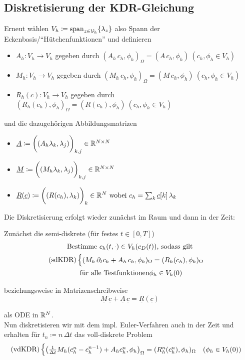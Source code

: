 \subsection{Diskretisierung der KDR-Gleichung}
Erneut wählen $ V_h \coloneqq \operatorname{span}_{z \in \mathcal{V}_h} \{ \lambda_z \} $ also Spann der Eckenbasis/\enquote{Hütchenfunktionen} und definieren
\begin{itemize}
	\item $ A_h: V_h \to V_h $ gegeben durch $ (A_h \, c_h, \phi_h)_\Omega = (A \, c_h, \phi_h) \ (c_h, \phi_h \in V_h)$
	\item $ M_h: V_h \to V_h $ gegeben durch $ (M_h \, c_h, \phi_h)_\Omega = (M \, c_h, \phi_h) \ (c_h, \phi_h \in V_h)$
	\item $ R_h(c): V_h \to V_h $ gegeben durch $ (R_h(c_h), \phi_h)_\Omega = (R(c_h), \phi_h) \ (c_h, \phi_h \in V_h)$
\end{itemize}
und die dazugehörigen Abbildungsmatrizen
\begin{itemize}
	\item $\underline{A} \coloneqq \bigg( (A_h \lambda_k, \lambda_j) \bigg)_{k,j} \in \mathbb{R}^{N \times N}$
	\item $\underline{M} \coloneqq \bigg( (M_h \lambda_k, \lambda_j) \bigg)_{k,j} \in \mathbb{R}^{N \times N}$
	\item $ \underline{R}(\underline{c}) \coloneqq \bigg( (R(c_h),\lambda_k) \bigg)_k \in \mathbb{R}^N \text{ wobei } c_h = \sum_k \underline{c}[k] \, \lambda_k $
\end{itemize}
Die Diskretisierung erfolgt wieder zunächst im Raum und dann in der Zeit:

Zunächst die semi-diskrete  (für festes $ t \in [0,T]$) 
\begin{gather*}
	\text{Bestimme } c_h(t,\cdot) \in V_h(c_D(t)) \text{, sodass gilt}\\
	\operatorname{(sdKDR)}\begin{cases}
		(M_h \, \partial_t c_h + A_h \, c_h, \phi_h)_\Omega = (R_h(c_h), \phi_h)_\Omega
	\end{cases}\\
	\text{ für alle Testfunktionen} \phi_h \in V_h(0) 
\end{gather*}

beziehungsweise in Matrizenschreibweise 
\[ \underline{M} \, \underline{\dot{c}} + \underline{A} \, \underline{c} = \underline{R}(\underline{c})  \]

als ODE in $ \mathbb{R}^N $.\\
Nun diskretisieren wir mit dem impl. Euler-Verfahren auch in der Zeit und erhalten für $ t_n \coloneqq n \, \Delta t  $ das voll-diskrete Problem
\begin{gather*}
\operatorname{(vdKDR)} \begin{cases}
	\left( \frac{1}{\Delta t} M_h(c_h^n - c_h^{n-1}) + A_h c_h^n, \phi_h \right)_\Omega = (R_h^n(c_h^n),\phi_h)_\Omega \quad (\phi_h \in V_h(0))
\end{cases}
\end{gather*}

